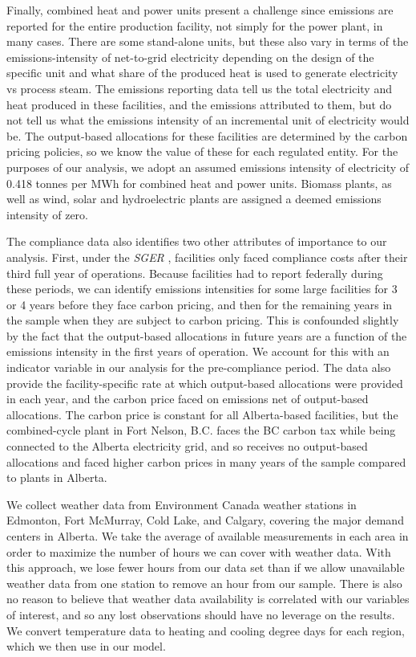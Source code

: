 \documentclass[12pt]{article}
\newcommand{\SGER}{\textit{SGER} }
\begin{document}
Finally, combined heat and power units present a challenge since emissions are reported for the entire production facility, not simply for the power plant, in many cases. There are some stand-alone units, but these also vary in terms of the emissions-intensity of net-to-grid electricity depending on the design of the specific unit and what share of the produced heat is used to generate electricity vs process steam. The emissions reporting data tell us the total electricity and heat produced in these facilities, and the emissions attributed to them, but do not tell us what the emissions intensity of an incremental unit of electricity would be. The output-based allocations for these facilities are determined by the carbon pricing policies, so we know the value of these for each regulated entity. For the purposes of our analysis, we adopt an assumed emissions intensity of electricity of 0.418 tonnes per MWh for combined heat and power units. Biomass plants, as well as wind, solar and hydroelectric plants are assigned a deemed emissions intensity of zero.

The compliance data also identifies two other attributes of importance to our analysis. First, under the \SGER, facilities only faced compliance costs after their third full year of operations. Because facilities had to report federally during these periods, we can identify emissions intensities for some large facilities for 3 or 4 years before they face carbon pricing, and then for the remaining years in the sample when they are subject to carbon pricing. This is confounded slightly by the fact that the output-based allocations in future years are a function of the emissions intensity in the first years of operation. We account for this with an indicator variable in our analysis for the pre-compliance period. The data also provide the facility-specific rate at which output-based allocations were provided in each year, and the carbon price faced on emissions net of output-based allocations. The carbon price is constant for all Alberta-based facilities, but the combined-cycle plant in Fort Nelson, B.C. faces the BC carbon tax while being connected to the Alberta electricity grid, and so receives no output-based allocations and faced higher carbon prices in many years of the sample compared to plants in Alberta.

We collect weather data from Environment Canada weather stations in Edmonton, Fort McMurray, Cold Lake, and Calgary, covering the major demand centers in Alberta.  We take the average of available measurements in each area in order to maximize the number of hours we can cover with weather data. With this approach, we lose fewer hours from our data set than if we allow unavailable weather data from one station to remove an hour from our sample. There is also no reason to believe that weather data availability is correlated with our variables of interest, and so any lost observations should have no leverage on the results. We convert temperature data to heating and cooling degree days for each region, which we then use in our model.
\end{document}
